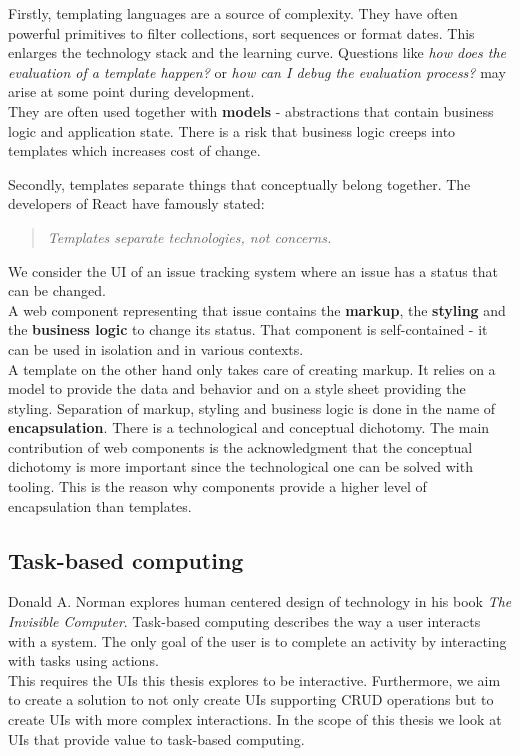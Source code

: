 Firstly, templating languages are a source of complexity. They have often powerful primitives to filter collections, sort sequences or format dates. This enlarges the technology stack and the learning curve. Questions like \textit{how does the evaluation of a template happen?} or \textit{how can I debug the evaluation process?} may arise at some point during development. \\
They are often used together with \textbf{models} - abstractions that contain business logic and application state. There is a risk that business logic creeps into templates which increases cost of change.

Secondly, templates separate things that conceptually belong together. The developers of React have famously stated:
\begin{quote}
\textit{Templates separate technologies, not concerns.}
\end{quote}
We consider the UI of an issue tracking system where an issue has a status that can be changed. \\ A web component representing that issue contains the \textbf{markup}, the \textbf{styling} and the \textbf{business logic} to change its status. That component is self-contained - it can be used in isolation and in various contexts. \\
A template on the other hand only takes care of creating markup. It relies on a model to provide the data and behavior and on a style sheet providing the styling.
Separation of markup, styling and business logic is done in the name of \textbf{encapsulation}. There is a technological and conceptual dichotomy. The main contribution of web components is the acknowledgment that the conceptual dichotomy is more important since the technological one can be solved with tooling. This is the reason why components provide a higher level of encapsulation than templates.

\subsection{Task-based computing}
Donald A. Norman explores human centered design of technology in his book \textit{The Invisible Computer}. Task-based computing describes the way a user interacts with a system. The only goal of the user is to complete an activity by interacting with tasks using actions. \citep{invisiblecomputer} \\
This requires the UIs this thesis explores to be interactive. Furthermore, we aim to create a solution to not only create UIs supporting CRUD operations but to create UIs with more complex interactions. In the scope of this thesis we look at UIs that provide value to task-based computing.

